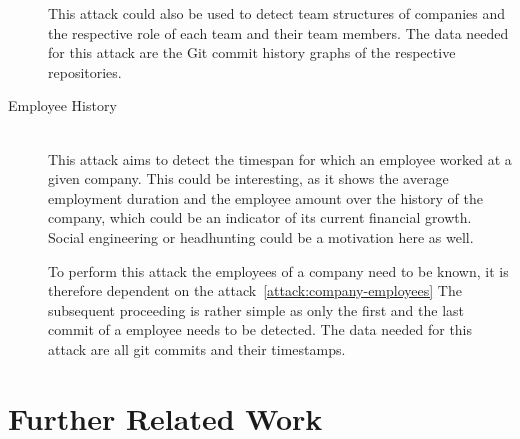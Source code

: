 \begin{description}
        This attack could also be used to detect team structures of companies and the respective role of each team and their team members.
        The data needed for this attack are the Git commit history graphs of the respective repositories.

    \item[Employee History] \hfill \\
        This attack aims to detect the timespan for which an employee worked at a given company.
        This could be interesting, as it shows the average employment duration and the employee amount over the history of the company, which could be an indicator of its current financial growth.
        Social engineering or headhunting could be a motivation here as well.

        To perform this attack the employees of a company need to be known, it is therefore dependent on the attack~\ref{attack:company-employees}
        The subsequent proceeding is rather simple as only the first and the last commit of a employee needs to be detected.
        The data needed for this attack are all git commits and their timestamps.

\end{description}


\section{Further Related Work}~\label{further-related-work}


